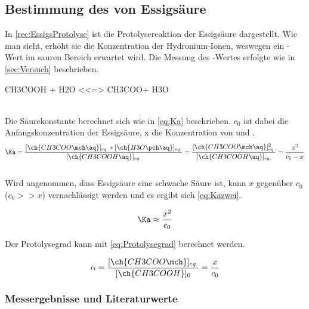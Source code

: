 \documentclass{article}
\begin{document}
    \subsection{Bestimmung des \pKa von Essigsäure} \label{sec:pKAEssigs}
      
      In \ref{rec:EssigsProtolyse} ist die Protolysereaktion der Essigsäure dargestellt. Wie man sieht, erhöht sie die Konzentration der Hydronium-Ionen, weswegen ein \pH-Wert im sauren Bereich erwartet wird. Die Messung des \pH-Wertes erfolgte wie in \ref{sec:Versuch} beschrieben.\\
      
      \begin{reaction}
        CH3COOH + H2O <<=> CH3COO\mch[] + H3O\pch \label{rec:EssigsProtolyse} \\
      \end{reaction} \\
      
      Die Säurekonstante \Ka berechnet sich wie in \eqref{eq:Ka} beschrieben. $c_{0}$ ist dabei die Anfangskonzentration der Essigsäure, x die Konzentration von  und .\\
      
      \begin{equation}
        \Ka = \frac{[\ch{CH3COO\mch\aq}]_{eq.}*[\ch{H3O\pch\aq}]_{eq.}}{[\ch{CH3COOH\aq}]_{eq.}} = \frac{[\ch{CH3COO\mch\aq}]_{eq.}^2}{[\ch{CH3COOH\aq}]_{eq.}} = \frac{x^2}{c_{0}-x} \label{eq:Ka}
      \end{equation} \\
      
      Wird angenommen, dass Essigsäure eine schwache Säure ist, kann $x$ gegenüber $c_{0}$ ($c_{0} >> x$) vernachlässigt werden und es ergibt sich \eqref{eq:Kazwei}.
      
      \begin{equation}
        \Ka \approx \frac{x^2}{c_{0}} \label{eq:Kazwei}
      \end{equation}
      
      Der Protolysegrad kann mit \eqref{eq:Protolysegrad} berechnet werden.
      
      \begin{equation}
        \alpha = \frac{[\ch{CH3COO\mch}]_{eq.}}{[\ch{CH3COOH}]_{0}} = \frac{x}{c_{0}} \label{eq:Protolysegrad}
      \end{equation}
      
      \subsubsection{Messergebnisse und Literaturwerte} \label{sec:MessergebnisseEssigs}
      
\end{document}
